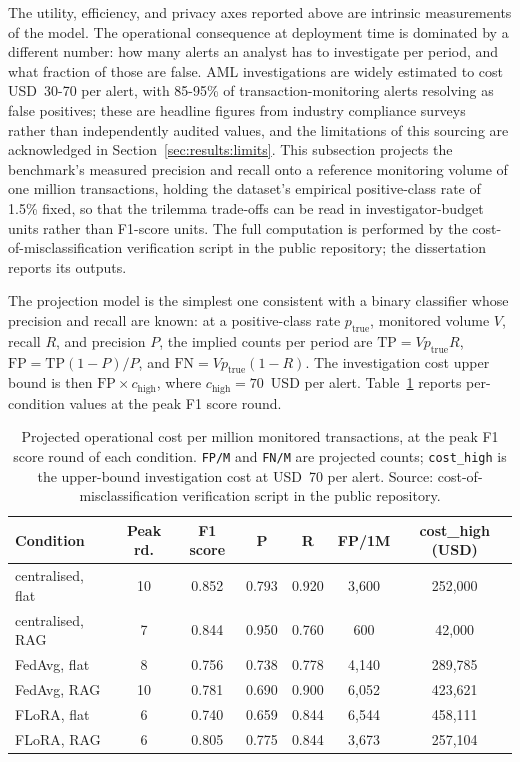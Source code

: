 \documentclass{report}
\begin{document}
The utility, efficiency, and privacy axes reported above are intrinsic measurements of the model. The operational consequence at deployment time is dominated by a different number: how many alerts an analyst has to investigate per period, and what fraction of those are false. AML investigations are widely estimated to cost USD~30-70 per alert, with 85-95\% of transaction-monitoring alerts resolving as false positives; these are headline figures from industry compliance surveys~\cite{lexisnexis2024costukfc} rather than independently audited values, and the limitations of this sourcing are acknowledged in Section~\ref{sec:results:limits}. This subsection projects the benchmark's measured precision and recall onto a reference monitoring volume of one million transactions, holding the dataset's empirical positive-class rate of 1.5\% fixed, so that the trilemma trade-offs can be read in investigator-budget units rather than F1-score units. The full computation is performed by the cost-of-misclassification verification script in the public repository; the dissertation reports its outputs.

The projection model is the simplest one consistent with a binary classifier whose precision and recall are known: at a positive-class rate $p_{\text{true}}$, monitored volume $V$, recall $R$, and precision $P$, the implied counts per period are $\text{TP} = V p_{\text{true}} R$, $\text{FP} = \text{TP}(1 - P)/P$, and $\text{FN} = V p_{\text{true}}(1 - R)$. The investigation cost upper bound is then $\text{FP} \times c_{\text{high}}$, where $c_{\text{high}} = 70$~USD per alert. Table~\ref{tab:results:cost} reports per-condition values at the peak F1 score round.

\begin{table}[t]
\centering
\caption[Projected investigation cost per million transactions]{Projected operational cost per million monitored transactions, at the peak F1 score round of each condition. \texttt{FP/M} and \texttt{FN/M} are projected counts; \texttt{cost\_high} is the upper-bound investigation cost at USD~70 per alert. Source: cost-of-misclassification verification script in the public repository.}
\label{tab:results:cost}
\begin{tabular}{lcccccc}
\toprule
Condition & Peak rd. & F1 score & P & R & FP/1M & cost\_high (USD) \\
\midrule
centralised, flat   & 10 & 0.852 & 0.793 & 0.920 & 3{,}600 & 252{,}000 \\
centralised, RAG    &  7 & 0.844 & 0.950 & 0.760 &   600 &  42{,}000 \\
FedAvg, flat        &  8 & 0.756 & 0.738 & 0.778 & 4{,}140 & 289{,}785 \\
FedAvg, RAG         & 10 & 0.781 & 0.690 & 0.900 & 6{,}052 & 423{,}621 \\
FLoRA, flat         &  6 & 0.740 & 0.659 & 0.844 & 6{,}544 & 458{,}111 \\
FLoRA, RAG          &  6 & 0.805 & 0.775 & 0.844 & 3{,}673 & 257{,}104 \\
\bottomrule
\end{tabular}
\end{table}
\end{document}

